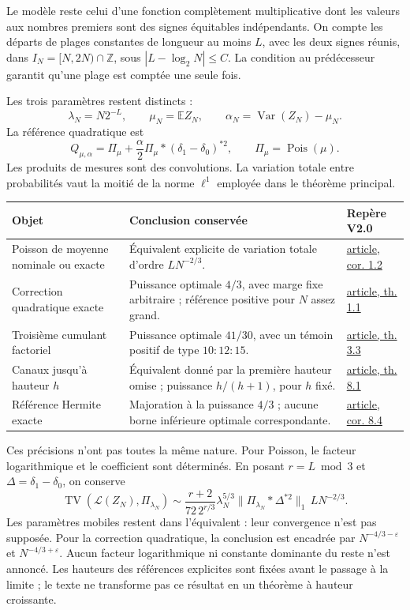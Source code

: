 \documentclass[11pt,a4paper]{article}
\newcommand{\E}{\mathbb E}
\newcommand{\article}[1]{\href{P1_V2_0_Main_EN.pdf}{article, #1}}
\begin{document}
Le modèle reste celui d'une fonction complètement multiplicative dont les valeurs aux nombres premiers sont des signes équitables indépendants. On compte les départs de plages constantes de longueur au moins $L$, avec les deux signes réunis, dans $I_N=[N,2N)\cap\mathbb Z$, sous $|L-\log_2N|\le C$. La condition au prédécesseur garantit qu'une plage est comptée une seule fois.

Les trois paramètres restent distincts :
\[
 \lambda_N=N2^{-L},\qquad \mu_N=\E Z_N,\qquad
 \alpha_N=\operatorname{Var}(Z_N)-\mu_N.
\]
La référence quadratique est
\[
 Q_{\mu,\alpha}=\Pi_\mu+
       \frac{\alpha}{2}\Pi_\mu*(\delta_1-\delta_0)^{*2},
 \qquad \Pi_\mu=\operatorname{Pois}(\mu).
\]
Les produits de mesures sont des convolutions. La variation totale entre probabilités vaut la moitié de la norme $\ell^1$ employée dans le théorème principal.

\begin{center}
\small
\begin{tabularx}{\textwidth}{@{}>{\raggedright\arraybackslash}p{}>{\raggedright\arraybackslash}X>{\raggedright\arraybackslash}p{}@{}}
\toprule
Objet & Conclusion conservée & Repère V2.0\\
\midrule
Poisson de moyenne nominale ou exacte & Équivalent explicite de variation totale d'ordre $LN^{-2/3}$. & \article{cor. 1.2}\\[4pt]
Correction quadratique exacte & Puissance optimale $4/3$, avec marge fixe arbitraire ; référence positive pour $N$ assez grand. & \article{th. 1.1}\\[4pt]
Troisième cumulant factoriel & Puissance optimale $41/30$, avec un témoin positif de type $10:12:15$. & \article{th. 3.3}\\[4pt]
Canaux jusqu'à hauteur $h$ & Équivalent donné par la première hauteur omise ; puissance $h/(h+1)$, pour $h$ fixé. & \article{th. 8.1}\\[4pt]
Référence Hermite exacte & Majoration à la puissance $4/3$ ; aucune borne inférieure optimale correspondante. & \article{cor. 8.4}\\
\bottomrule
\end{tabularx}
\end{center}

Ces précisions n'ont pas toutes la même nature. Pour Poisson, le facteur logarithmique et le coefficient sont déterminés. En posant $r=L\bmod3$ et $\Delta=\delta_1-\delta_0$, on conserve
\[
 \operatorname{TV}(\mathcal L(Z_N),\Pi_{\lambda_N})
 \sim \frac{r+2}{72\,2^{r/3}}\lambda_N^{5/3}
       \|\Pi_{\lambda_N}*\Delta^{*2}\|_1\,LN^{-2/3}.
\]
Les paramètres mobiles restent dans l'équivalent : leur convergence n'est pas supposée. Pour la correction quadratique, la conclusion est encadrée par $N^{-4/3-\varepsilon}$ et $N^{-4/3+\varepsilon}$. Aucun facteur logarithmique ni constante dominante du reste n'est annoncé. Les hauteurs des références explicites sont fixées avant le passage à la limite ; le texte ne transforme pas ce résultat en un théorème à hauteur croissante.
\end{document}
